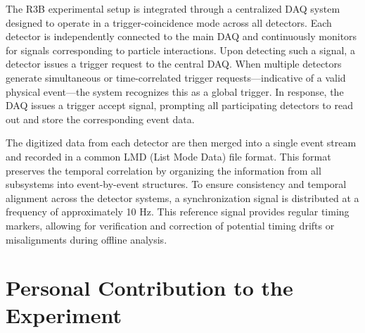 The R3B experimental setup is integrated through a centralized \gls{DAQ} system designed to operate in a trigger-coincidence mode across all detectors. Each detector is independently connected to the main \gls{DAQ} and continuously monitors for signals corresponding to particle interactions. Upon detecting such a signal, a detector issues a trigger request to the central \gls{DAQ}. When multiple detectors generate simultaneous or time-correlated trigger requests—indicative of a valid physical event—the system recognizes this as a global trigger. In response, the \gls{DAQ} issues a trigger accept signal, prompting all participating detectors to read out and store the corresponding event data.

The digitized data from each detector are then merged into a single event stream and recorded in a common LMD (List Mode Data) file format. This format preserves the temporal correlation by organizing the information from all subsystems into event-by-event structures. To ensure consistency and temporal alignment across the detector systems, a synchronization signal is distributed at a frequency of approximately 10 Hz. This reference signal provides regular timing markers, allowing for verification and correction of potential timing drifts or misalignments during offline analysis.


\section{Personal Contribution to the Experiment}